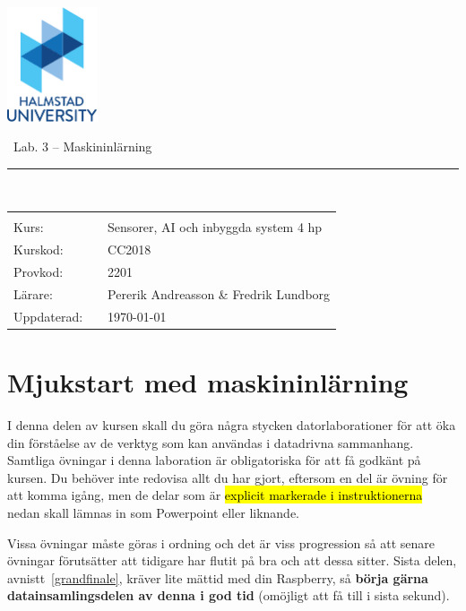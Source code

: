 \documentclass{article}
\newcommand{\kursnamn}{Sensorer, AI och inbyggda system 4 hp}
\newcommand{\kurskod}{CC2018}
\newcommand{\provkod}{2201}
\begin{document}
  \includegraphics[width=0.2\textwidth]{figures/HH_ENG_color_small.pdf}

\vspace{5mm}
  
	\begin{center}
 \
	{\Huge{}Lab. 3 -- Maskininlärning}
	\end{center}
\noindent\rule{\textwidth}{2pt}
\\


{\Large
\begin{tabular}{p{2cm}p{1cm}p{10cm}}
&  &  \\
Kurs: & 	& 	\kursnamn \\
Kurskod: & & \kurskod \\
Provkod: &  & \provkod \\
L\"arare: &  & Pererik Andreasson \& Fredrik Lundborg\\
Uppdaterad: & & \today
\end{tabular}
}

\pagebreak

\tableofcontents


\section{Mjukstart med maskininlärning}
I denna delen av kursen skall du göra några stycken datorlaborationer för att öka din förståelse av de verktyg som kan användas i datadrivna sammanhang. 
Samtliga övningar i denna laboration är obligatoriska för att få godkänt på kursen. Du behöver inte redovisa allt du har gjort, eftersom en del är övning för att komma igång, men de delar som är \hl{explicit markerade i instruktionerna} nedan skall lämnas in som Powerpoint eller liknande. 

Vissa övningar måste göras i ordning och det är viss progression så att senare övningar förutsätter att tidigare har flutit på bra och att dessa sitter. Sista delen, avnistt~\ref{grandfinale}, kräver lite mättid med din Raspberry, så \textbf{börja gärna datainsamlingsdelen av denna i god tid} (omöjligt att få till i sista sekund). 
\end{document}
